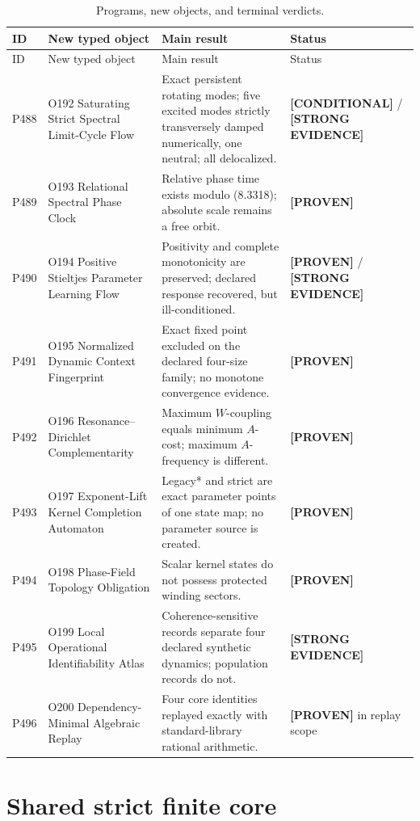 \documentclass[11pt,a4paper]{article}
\theoremstyle{definition}
\theoremstyle{remark}
\newcommand{\status}[2]{\textcolor{#1}{\textbf{[#2]}}}
\newcommand{\proven}{\status{fingreen}{PROVEN}}
\newcommand{\strong}{\status{finblue}{STRONG EVIDENCE}}
\newcommand{\conditional}{\status{fingray}{CONDITIONAL}}
\begin{document}
\begin{longtable}{@{}p{}p{}p{}p{}@{}}
\caption{Programs, new objects, and terminal verdicts.}\\
\toprule
ID & New typed object & Main result & Status\\
\midrule
\endfirsthead
\toprule
ID & New typed object & Main result & Status\\
\midrule
\endhead
P488 & O192 Saturating Strict Spectral Limit-Cycle Flow & Exact persistent rotating modes; five excited modes strictly transversely damped numerically, one neutral; all delocalized. & \conditional{} / \strong\\
P489 & O193 Relational Spectral Phase Clock & Relative phase time exists modulo (8.3318); absolute scale remains a free orbit. & \proven\\
P490 & O194 Positive Stieltjes Parameter Learning Flow & Positivity and complete monotonicity are preserved; declared response recovered, but ill-conditioned. & \proven{} / \strong\\
P491 & O195 Normalized Dynamic Context Fingerprint & Exact fixed point excluded on the declared four-size family; no monotone convergence evidence. & \proven\\
P492 & O196 Resonance--Dirichlet Complementarity & Maximum $W$-coupling equals minimum $A$-cost; maximum $A$-frequency is different. & \proven\\
P493 & O197 Exponent-Lift Kernel Completion Automaton & Legacy* and strict are exact parameter points of one state map; no parameter source is created. & \proven\\
P494 & O198 Phase-Field Topology Obligation & Scalar kernel states do not possess protected winding sectors. & \proven\\
P495 & O199 Local Operational Identifiability Atlas & Coherence-sensitive records separate four declared synthetic dynamics; population records do not. & \strong\\
P496 & O200 Dependency-Minimal Algebraic Replay & Four core identities replayed exactly with standard-library rational arithmetic. & \proven{} in replay scope\\
\bottomrule
\end{longtable}

\section{Shared strict finite core}
\end{document}

